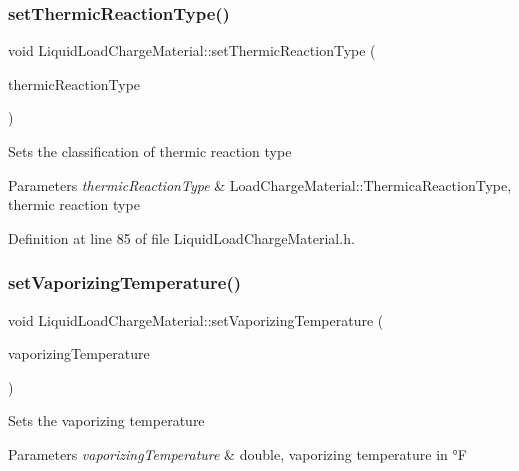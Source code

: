 \subsubsection{\texorpdfstring{set\+Thermic\+Reaction\+Type()}{setThermicReactionType()}\hspace{0.1cm}{\footnotesize\ttfamily [3/3]}}
{\footnotesize\ttfamily void Liquid\+Load\+Charge\+Material\+::set\+Thermic\+Reaction\+Type (\begin{DoxyParamCaption}\item[{\hyperlink{namespace_load_charge_material_a51d4263e865a5d86236622dd3fe23fd1}{Load\+Charge\+Material\+::\+Thermic\+Reaction\+Type}}]{thermic\+Reaction\+Type }\end{DoxyParamCaption})\hspace{0.3cm}{\ttfamily [inline]}}

Sets the classification of thermic reaction type 
\begin{DoxyParams}{Parameters}
{\em thermic\+Reaction\+Type} & Load\+Charge\+Material\+::\+Thermica\+Reaction\+Type, thermic reaction type \\
\hline
\end{DoxyParams}


Definition at line 85 of file Liquid\+Load\+Charge\+Material.\+h.

\mbox{\label{class_liquid_load_charge_material_a50938e3270de5d3c59b872f290a761cc}} 
\subsubsection{\texorpdfstring{set\+Vaporizing\+Temperature()}{setVaporizingTemperature()}\hspace{0.1cm}{\footnotesize\ttfamily [1/3]}}
{\footnotesize\ttfamily void Liquid\+Load\+Charge\+Material\+::set\+Vaporizing\+Temperature (\begin{DoxyParamCaption}\item[{const double}]{vaporizing\+Temperature }\end{DoxyParamCaption})\hspace{0.3cm}{\ttfamily [inline]}}

Sets the vaporizing temperature 
\begin{DoxyParams}{Parameters}
{\em vaporizing\+Temperature} & double, vaporizing temperature in °F \\
\hline
\end{DoxyParams}



